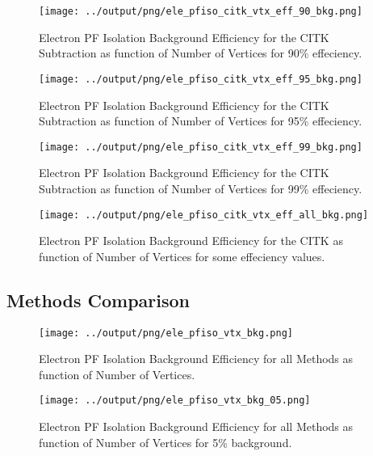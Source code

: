 \documentclass[11pt]{book}
\begin{document}
\begin{figure}[htb]
\centering
\texttt{[image: ../output/png/ele\_pfiso\_citk\_vtx\_eff\_90\_bkg.png]}
\caption{Electron PF Isolation Background Efficiency for the CITK Subtraction as function of Number of Vertices for 90\% effeciency.}
\label{fig:ele_pfiso_vtx_eff_citk_eff_90_bkg}
\end{figure}

\begin{figure}[htb]
\centering
\texttt{[image: ../output/png/ele\_pfiso\_citk\_vtx\_eff\_95\_bkg.png]}
\caption{Electron PF Isolation Background Efficiency for the CITK Subtraction as function of Number of Vertices for 95\% effeciency.}
\label{fig:ele_pfiso_vtx_eff_citk_eff_95_bkg}
\end{figure}

\begin{figure}[htb]
\centering
\texttt{[image: ../output/png/ele\_pfiso\_citk\_vtx\_eff\_99\_bkg.png]}
\caption{Electron PF Isolation Background Efficiency for the CITK Subtraction as function of Number of Vertices for 99\% effeciency.}
\label{fig:ele_pfiso_vtx_eff_citk_eff_99_bkg}
\end{figure}

\begin{figure}[htb]
\centering
\texttt{[image: ../output/png/ele\_pfiso\_citk\_vtx\_eff\_all\_bkg.png]}
\caption{Electron PF Isolation Background Efficiency for the CITK as function of Number of Vertices for some effeciency values.}
\label{fig:ele_pfiso_vtx_eff_citk_eff_all_bkg}
\end{figure}
\clearpage

\subsection{Methods Comparison}
\begin{figure}[htb]
\centering
\texttt{[image: ../output/png/ele\_pfiso\_vtx\_bkg.png]}
\caption{Electron PF Isolation Background Efficiency for all Methods as function of Number of Vertices.}
\label{fig:ele_pfiso_vtx_bkg}
\end{figure}

\begin{figure}[htb]
\centering
\texttt{[image: ../output/png/ele\_pfiso\_vtx\_bkg\_05.png]}
\caption{Electron PF Isolation Background Efficiency for all Methods as function of Number of Vertices for 5\% background.}
\label{fig:ele_pfiso_vtx_bkg_05}
\end{figure}
\end{document}
